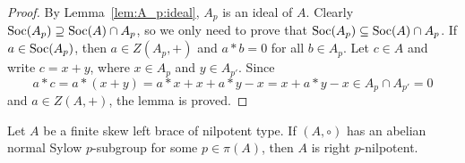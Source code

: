 \begin{proof}
    By Lemma~\ref{lem:A_p:ideal}, $A_p$ is an ideal of $A$. 
    Clearly $\operatorname{Soc}(A_p)\supseteq\operatorname{Soc}(A)\cap A_p$, so 
    we only need to prove that $\operatorname{Soc}(A_p)\subseteq\operatorname{Soc}(A)\cap A_p$. 
    If $a\in\operatorname{Soc}(A_p)$, then $a\in Z(A_p,+)$ and
    $a*b=0$ for all $b\in A_p$. Let $c\in A$ and write $c=x+y$, where $x\in A_p$ and 
    $y\in A_{p'}$. Since 
    \[
    a*c=a*(x+y)=a*x+x+a*y-x=x+a*y-x\in A_p\cap A_{p'}=0
    \]
    and $a\in Z(A,+)$, the lemma is proved.
\end{proof}

\begin{theorem}
\label{thm:right_p}
    Let $A$ be a finite skew left brace of nilpotent type. If $(A,\circ)$ has an abelian normal
    Sylow $p$-subgroup for some $p\in\pi(A)$, then $A$ is right $p$-nilpotent.
\end{theorem}


